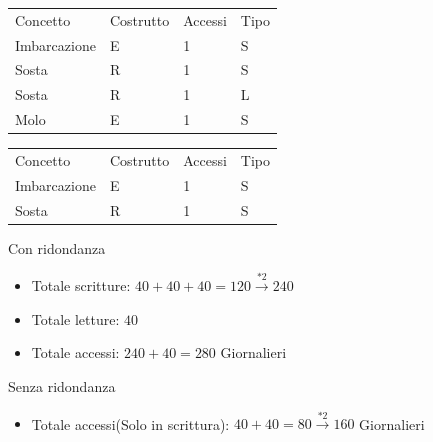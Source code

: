 \begin{center}
    \begin{minipage}{.48\linewidth}
        \begin{tabularx}{\linewidth}{|X|l|l|l|}
            \hline
            \rowcolor{gray!30}
            \multicolumn{4}{|c|}{\textbf{Con ridondanza}}\\
            \hline
            \rowcolor{gray!15}
            Concetto & Costrutto & Accessi & Tipo\\
            \hline
            Imbarcazione & E & 1 & S\\
            \hline
            Sosta & R & 1 & S\\
            \hline
            Sosta & R & 1 & L\\
            \hline
            Molo & E & 1 & S\\
            \hline
        \end{tabularx}
    \end{minipage}
    \begin{minipage}{.48\linewidth}
        \begin{tabularx}{\linewidth}{|X|l|l|l|}
            \hline
            \rowcolor{gray!30}
            \multicolumn{4}{|c|}{\textbf{Senza ridondanza}}\\
            \hline
            \rowcolor{gray!15}
            Concetto & Costrutto & Accessi & Tipo\\
            \hline
            Imbarcazione & E & 1 & S\\
            \hline
            Sosta & R & 1 & S\\
            \hline
        \end{tabularx}
    \end{minipage}
\end{center}


Con ridondanza
\begin{itemize}
    \item Totale scritture: $40 + 40 + 40 = 120 \xrightarrow{*2} 240$ 
    \item Totale letture: $40$
    \item Totale accessi: $240+40 = 280$ Giornalieri
\end{itemize}
Senza ridondanza
\begin{itemize}
    \item Totale accessi(Solo in scrittura): $40+40 = 80 \xrightarrow{*2} 160 $ Giornalieri
\end{itemize}


